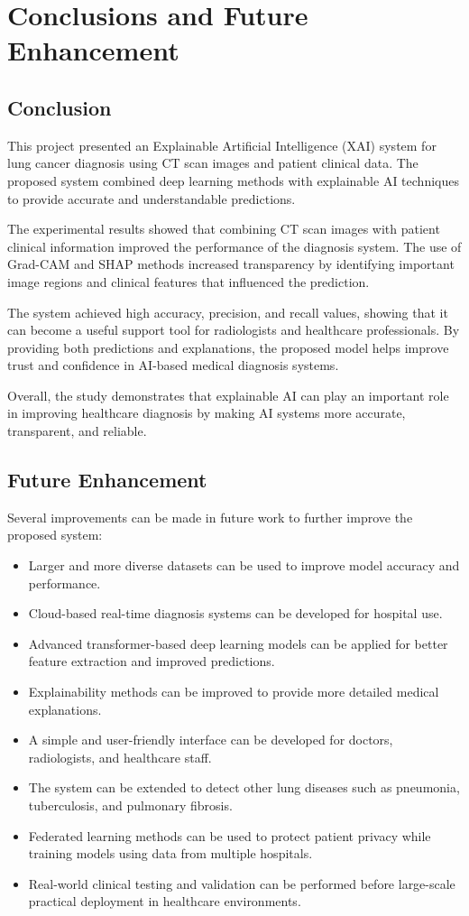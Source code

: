 
\chapter{Conclusions and Future Enhancement}\thispagestyle{empty} %
\graphicspath{{Chapter6/}}
{{}
\section{Conclusion}
This project presented an Explainable Artificial Intelligence (XAI) system for lung cancer diagnosis using CT scan images and patient clinical data. The proposed system combined deep learning methods with explainable AI techniques to provide accurate and understandable predictions.

The experimental results showed that combining CT scan images with patient clinical information improved the performance of the diagnosis system. The use of Grad-CAM and SHAP methods increased transparency by identifying important image regions and clinical features that influenced the prediction.

The system achieved high accuracy, precision, and recall values, showing that it can become a useful support tool for radiologists and healthcare professionals. By providing both predictions and explanations, the proposed model helps improve trust and confidence in AI-based medical diagnosis systems.

Overall, the study demonstrates that explainable AI can play an important role in improving healthcare diagnosis by making AI systems more accurate, transparent, and reliable.

\section{Future Enhancement}
Several improvements can be made in future work to further improve the proposed system:
\begin{itemize}
    \item Larger and more diverse datasets can be used to improve model accuracy and performance.
    \item Cloud-based real-time diagnosis systems can be developed for hospital use.
    \item Advanced transformer-based deep learning models can be applied for better feature extraction and improved predictions.
    \item Explainability methods can be improved to provide more detailed medical explanations.
    \item A simple and user-friendly interface can be developed for doctors, radiologists, and healthcare staff.
    \item The system can be extended to detect other lung diseases such as pneumonia, tuberculosis, and pulmonary fibrosis.
    \item Federated learning methods can be used to protect patient privacy while training models using data from multiple hospitals.
    \item Real-world clinical testing and validation can be performed before large-scale practical deployment in healthcare environments.
\end{itemize}

}


